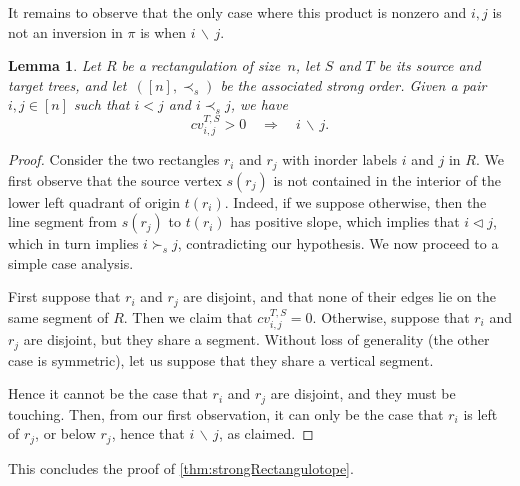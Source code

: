 \documentclass{amsart}
\newtheorem{lemma}[theorem]{Lemma}
\theoremstyle{definition}
\newcommand{\tri}{\lhd}
\begin{document}
It remains to observe that the only case where this product is nonzero and $i,j$ is not an inversion in $\pi$ is when $i \, \backslash \, j$.

\begin{lemma}
  Let $R$ be a rectangulation of size~$n$, let $S$ and $T$ be its source and target trees, and let~$([n],\prec_s)$ be the associated strong order.
  Given a pair $i,j\in [n]$ such that $i<j$ and $i\prec_s j$, we have
  \[
    cv^{T,S}_{i,j} > 0 \quad \Longrightarrow \quad i \, \backslash \, j.
  \]
\end{lemma}
\begin{proof}
  Consider the two rectangles $r_i$ and $r_j$ with inorder labels $i$ and $j$ in $R$.
  We first observe that the source vertex $s(r_j)$ is not contained in the interior of the lower left quadrant of origin $t(r_i)$.
  Indeed, if we suppose otherwise, then the line segment from $s(r_j)$ to $t(r_i)$ has positive slope, which implies that $i\tri j$, which in turn implies $i\succ_s j$, contradicting our hypothesis.
  We now proceed to a simple case analysis.
  
  First suppose that $r_i$ and $r_j$ are disjoint, and that none of their edges lie on the same segment of $R$.
  Then we claim that $cv^{T,S}_{i,j} = 0$.
  Otherwise, suppose that $r_i$ and $r_j$ are disjoint, but they share a segment.
  Without loss of generality (the other case is symmetric), let us suppose that they share a vertical segment.
  
  
  Hence it cannot be the case that $r_i$ and $r_j$ are disjoint, and they must be touching.
  Then, from our first observation, it can only be the case that $r_i$ is left of $r_j$, or below $r_j$, hence that $i\, \backslash \, j$, as claimed.
  \end{proof}

This concludes the proof of \cref{thm:strongRectangulotope}.


{}


\label{sec:biblio}

\end{document}
